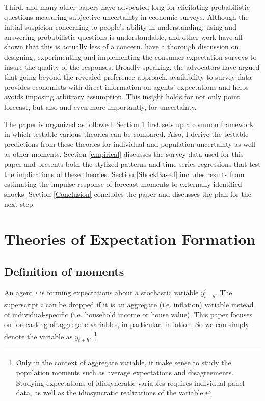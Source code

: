 \documentclass[]{article}
\begin{document}
	Third, \citet{manski2004measuring} and many other papers have advocated long for elicitating probabilistic questions measuring subjective uncertainty in economic surveys. Although the initial suspicion concerning to people's ability in understanding, using and answering probabilistic questions is understandable, \citet{bertrand2001people} and other work have all shown that this is actually less of a concern. \citet{armantier2017overview} have a thorough discussion on designing, experimenting and implementing the consumer expectation surveys to insure the quality of the responses. Broadly speaking, the advocators have argued that going beyond the revealed preference approach, availability to survey data provides economists with direct information on agents' expectations and helps avoids imposing arbitrary assumption.  This insight holds for not only point forecast, but also and even more importantly, for uncertainty.
	
	The paper is organized as followed. Section \ref{theory} first sets up a common framework in which testable various theories can be compared. Also, I derive the testable predictions from these theories for individual and population uncertainty as well as other moments. Section \ref{empirical} discusses the survey data used for this paper and presents both the stylized patterns and time series regressions that test the implications of these theories.   Section \ref{ShockBased} includes results from estimating the impulse response of forecast moments to externally identified shocks.  Section \ref{Conclusion} concludes the paper and discusses the plan for the next step. 
	
	\section{Theories of Expectation Formation}\label{theory}
	
	\subsection{Definition of moments}
	
	An agent $i$ is forming expectations about a stochastic variable $y^i_{t+h}$. The superscript $i$ can be dropped if it is an aggregate (i.e. inflation) variable instead of individual-specific  (i.e. household income or house value). This paper focuses on forecasting of aggregate variables, in particular, inflation. So we can simply denote the variable as $y_{t+h}$.  \footnote{Only in the context of aggregate variable, it make sense to study the population moments such as average expectations and disagreements. Studying expectations of idiosyncratic variables requires individual panel data, as well as the idiosyncratic realizations of the variable. }
	
\end{document}
